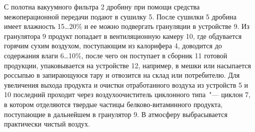 С полотна вакуумного фильтра 2 дробину при помощи средства межоперационной передачи подают в сушилку 5.
После сушилки 5 дробина имеет влажность 15\dots20\% и ее можно подвергать грануляции в устройстве 9.
Из гранулятора 9 продукт попадает в вентиляционную камеру 10, где обдувается горячим сухим воздухом, поступающим из калорифера 4, доводится до содержания влаги 6\dots10\%, после чего он поступает в сборник 11 готовой продукции, упаковывается на устройстве 12, например, в мешки или насыпается россыпью в запирающуюся тару и отвозится на склад или потребителю.
Для увеличения выхода продукта и очистки отработанного воздуха из устройств 5 и 10 последний проходит через воздухоочиститель циклонного типа~"--- циклон 7, в котором отделяются твердые частицы белково-витаминного продукта, поступающие в дальнейшем в гранулятор 9.
В атмосферу выбрасывается практически чистый воздух.

